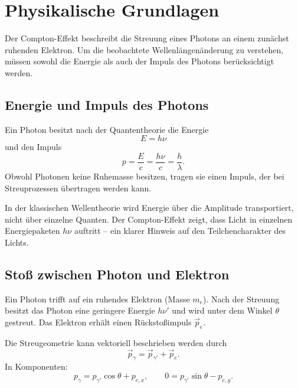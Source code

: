 
\section{Physikalische Grundlagen}

Der Compton-Effekt beschreibt die Streuung eines Photons an einem zunächst ruhenden Elektron. 
Um die beobachtete Wellenlängenänderung zu verstehen, müssen sowohl die Energie 
als auch der Impuls des Photons berücksichtigt werden.

\subsection{Energie und Impuls des Photons}
Ein Photon besitzt nach der Quantentheorie die Energie
\[
E = h\nu
\]
und den Impuls
\[
p = \frac{E}{c} = \frac{h\nu}{c} = \frac{h}{\lambda}.
\]
Obwohl Photonen keine Ruhemasse besitzen, tragen sie einen Impuls, 
der bei Streuprozessen übertragen werden kann. 

\begin{DidaktikBox}
	In der klassischen Wellentheorie wird Energie über die Amplitude transportiert, 
	nicht über einzelne Quanten. 
	Der Compton-Effekt zeigt, dass Licht in einzelnen Energiepaketen \( h\nu \) auftritt 
	– ein klarer Hinweis auf den Teilchencharakter des Lichts.
\end{DidaktikBox}

\subsection{Stoß zwischen Photon und Elektron}
Ein Photon trifft auf ein ruhendes Elektron (Masse \( m_e \)). 
Nach der Streuung besitzt das Photon eine geringere Energie \( h\nu' \) 
und wird unter dem Winkel \( \theta \) gestreut. 
Das Elektron erhält einen Rückstoßimpuls \( \vec{p}_e \).

\begin{PhysikBox}[Streugeometrie]
	\small
	Die Streugeometrie kann vektoriell beschrieben werden durch
	\[
	\vec{p}_\gamma = \vec{p}_{\gamma'} + \vec{p}_e.
	\]
	In Komponenten:
	\[
	p_\gamma = p_{\gamma'}\cos\theta + p_{e,x}, \qquad
	0 = p_{\gamma'}\sin\theta - p_{e,y}.
	\]
\end{PhysikBox}

